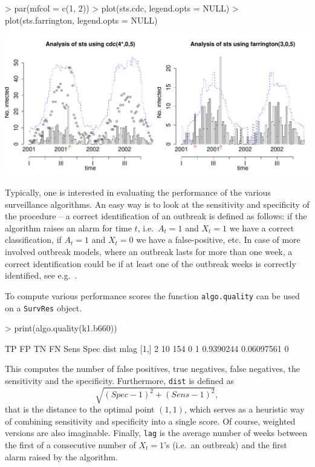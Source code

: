 \documentclass[a4paper,11pt]{article}
\begin{document}
\begin{Schunk}
\begin{Sinput}
> par(mfcol = c(1, 2))
> plot(sts.cdc, legend.opts = NULL)
> plot(sts.farrington, legend.opts = NULL)
\end{Sinput}
\end{Schunk}
\includegraphics{figs/vignette-007}


Typically, one is interested in evaluating the performance of the
various surveillance algorithms. An easy way is to look at the
sensitivity and specificity of the procedure -- a correct
identification of an outbreak is defined as follows: if the algorithm
raises an alarm for time $t$, i.e.\ $A_t=1$ and $X_t=1$ we have a
correct classification, if $A_t=1$ and $X_t=0$ we have a
false-positive, etc. In case of more involved outbreak models, where
an outbreak lasts for more than one week, a correct identification
could be if at least one of the outbreak weeks is correctly
identified, see e.g.\ \citet{hutwagner2005}.

To compute various performance scores the function
\verb+algo.quality+ can be used on a \verb+SurvRes+ object.

\begin{Schunk}
\begin{Sinput}
> print(algo.quality(k1.b660))
\end{Sinput}
\begin{Soutput}
     TP FP TN  FN Sens Spec      dist       mlag
[1,] 2  10 154 0  1    0.9390244 0.06097561 0   
\end{Soutput}
\end{Schunk}
This computes the number of false positives, true negatives, false
negatives, the sensitivity and the specificity. Furthermore, \texttt{dist}
is defined as
\[
\sqrt{(Spec-1)^2 + (Sens - 1)^2},
\]
that is the distance to the optimal point $(1,1)$, which serves as a
heuristic way of combining sensitivity and specificity into a single
score. Of course, weighted versions are also imaginable.  Finally,
\texttt{lag} is the average number of weeks between the first of a
consecutive number of $X_t=1$'s (i.e.\ an outbreak) and the first
alarm raised by the algorithm.
\end{document}
